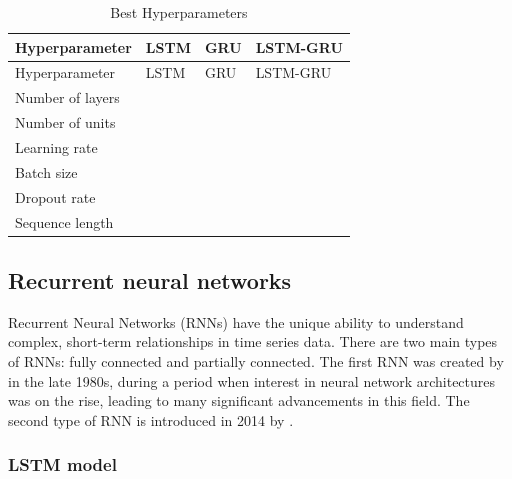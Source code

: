 \documentclass[]{interact}
\theoremstyle{plain}%
\theoremstyle{definition}
\theoremstyle{remark}
\begin{document}
\begin{longtable}[]{@{}llll@{}}
\caption{Best Hyperparameters}\tabularnewline
\toprule\noalign{}
Hyperparameter & LSTM & GRU & LSTM-GRU \\
\midrule\noalign{}
\endfirsthead
\toprule\noalign{}
Hyperparameter & LSTM & GRU & LSTM-GRU \\
\midrule\noalign{}
\endhead
\bottomrule\noalign{}
\endlastfoot
Number of layers & & & \\
Number of units & & & \\
Learning rate & & & \\
Batch size & & & \\
Dropout rate & & & \\
Sequence length & & & \\
\end{longtable}

\subsection{Recurrent neural networks}\label{recurrent-neural-networks}

Recurrent Neural Networks (RNNs) have the unique ability to understand
complex, short-term relationships in time series data. There are two
main types of RNNs: fully connected and partially connected. The first
RNN was created by \citep{williams1989} in the late 1980s, during a
period when interest in neural network architectures was on the rise,
leading to many significant advancements in this field. The second type
of RNN is introduced in 2014 by \citep{chung2014}.

\subsubsection{LSTM model}\label{lstm-model}
\end{document}
